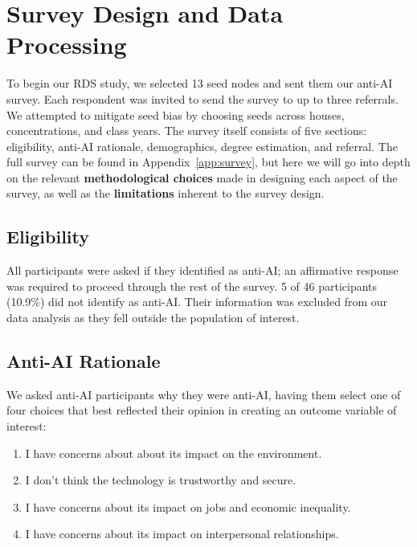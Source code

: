 \documentclass[11pt,a4paper,twocolumn,twoside]{rho-class/rho}
\begin{document}
\section{Survey Design and Data Processing}
To begin our RDS study, we selected 13 seed nodes and sent them our anti-AI survey. Each respondent was invited to send the survey to up to three referrals. We attempted to mitigate seed bias by choosing seeds across houses, concentrations, and class years. The survey itself consists of five sections: eligibility, anti-AI rationale, demographics, degree estimation, and referral. The full survey can be found in Appendix~\ref{app:survey}, but here we will go into depth on the relevant \textbf{methodological choices} made in designing each aspect of the survey, as well as the \textbf{limitations} inherent to the survey design.

\subsection{Eligibility}
All participants were asked if they identified as anti-AI; an affirmative response was required to proceed through the rest of the survey. 5 of 46 participants (10.9\%) did not identify as anti-AI. Their information was excluded from our data analysis as they fell outside the population of interest.

\subsection{Anti-AI Rationale} 
We asked anti-AI participants why they were anti-AI, having them select one of four choices that best reflected their opinion in creating an outcome variable of interest: \begin{enumerate}
    \item I have concerns about about its impact on the environment.
    \item I don't think the technology is trustworthy and secure.
    \item I have concerns about its impact on jobs and economic inequality.
    \item I have concerns about its impact on interpersonal relationships.
    \end{enumerate} 
\end{document}
